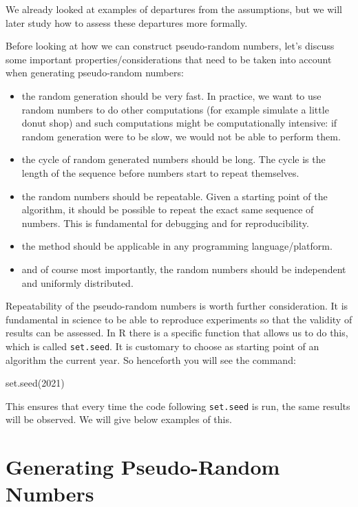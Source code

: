 \documentclass[
]{book}
\newenvironment{Shaded}{\begin{snugshade}}{\end{snugshade}}
\newcommand{\DecValTok}[1]{\textcolor[rgb]{0.00,0.00,0.81}{#1}}
\newcommand{\FunctionTok}[1]{\textcolor[rgb]{0.00,0.00,0.00}{#1}}
\newcommand{\NormalTok}[1]{#1}
\begin{document}
We already looked at examples of departures from the assumptions, but we will later study how to assess these departures more formally.

Before looking at how we can construct pseudo-random numbers, let's discuss some important properties/considerations that need to be taken into account when generating pseudo-random numbers:

\begin{itemize}
\item
  the random generation should be very fast. In practice, we want to use random numbers to do other computations (for example simulate a little donut shop) and such computations might be computationally intensive: if random generation were to be slow, we would not be able to perform them.
\item
  the cycle of random generated numbers should be long. The cycle is the length of the sequence before numbers start to repeat themselves.
\item
  the random numbers should be repeatable. Given a starting point of the algorithm, it should be possible to repeat the exact same sequence of numbers. This is fundamental for debugging and for reproducibility.
\item
  the method should be applicable in any programming language/platform.
\item
  and of course most importantly, the random numbers should be independent and uniformly distributed.
\end{itemize}

Repeatability of the pseudo-random numbers is worth further consideration. It is fundamental in science to be able to reproduce experiments so that the validity of results can be assessed. In R there is a specific function that allows us to do this, which is called \texttt{set.seed}. It is customary to choose as starting point of an algorithm the current year. So henceforth you will see the command:

\begin{Shaded}
\begin{Highlighting}[]
\FunctionTok{set.seed}\NormalTok{(}\DecValTok{2021}\NormalTok{)}
\end{Highlighting}
\end{Shaded}

This ensures that every time the code following \texttt{set.seed} is run, the same results will be observed. We will give below examples of this.

\hypertarget{generating-pseudo-random-numbers}{%
\section{Generating Pseudo-Random Numbers}\label{generating-pseudo-random-numbers}}
\end{document}
